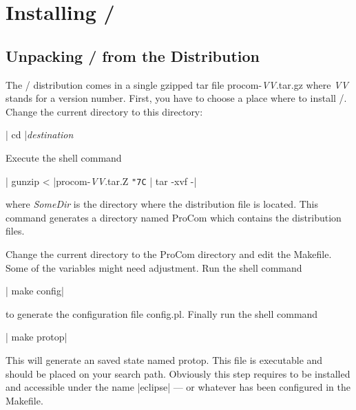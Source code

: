 
\chapter{Installing \ProCom/\ProTop}

\section{Unpacking \ProCom/\ProTop{} from the Distribution}%
\label{sec:installation}

The \ProCom/\ProTop{} distribution comes in a single gzipped tar file {\sf
  procom-{\em VV}.tar.gz} where {\em VV} stands for a version number. First,
you have to choose a place where to install \ProCom/\ProTop. Change the
current directory to this directory:

| cd |{\em destination}

Execute the shell command

|  gunzip < |{procom-{\em VV}.tar.Z} {\tt\char"7C} | tar -xvf -|

where {\em SomeDir}\/ is the directory where the distribution file is located.
This command generates a directory named {\sf ProCom} which contains the
distribution files.

Change the current directory to the {\sf ProCom} directory and edit the
Makefile.  Some of the variables might need adjustment.  Run the shell command

|  make config|

to generate the configuration file {\sf config.pl}.
Finally run the shell command

|  make protop|

This will generate an \eclipse{} saved state named {\sf protop}. This file is
executable and should be placed on your search path. Obviously this step
requires \eclipse{} to be installed and accessible under the name |eclipse|
--- or whatever has been configured in the Makefile.

